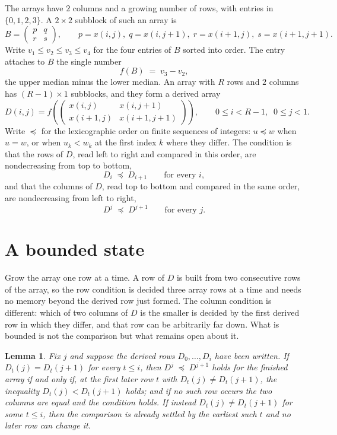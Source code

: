 \documentclass[11pt,a4paper]{article}
\theoremstyle{plain}
\newtheorem{lemma}[theorem]{Lemma}
\theoremstyle{definition}
\begin{document}
The arrays have $2$ columns and a growing number of rows, with entries in $\{0,1,2,3\}$. A
$2\times2$ subblock of such an array is
\[
B=\begin{pmatrix} p & q \\ r & s \end{pmatrix},
\qquad p=x(i,j),\; q=x(i,j+1),\; r=x(i+1,j),\; s=x(i+1,j+1).
\]
Write $v_1\le v_2\le v_3\le v_4$ for the four entries of $B$ sorted into order. The entry attaches to $B$ the single number
\[
f(B)\;=\;v_3-v_2,
\]
the upper median minus the lower median. An array with $R$ rows and $2$ columns has $(R-1)\times1$ subblocks, and they
form a derived array
\[
D(i,j)=f\!\left(\begin{pmatrix} x(i,j) & x(i,j+1) \\ x(i+1,j) & x(i+1,j+1)\end{pmatrix}
\right),\qquad 0\le i<R-1,\;\; 0\le j<1 .
\]
Write $\preceq$ for the lexicographic order on finite sequences of integers: $u\preceq w$ when
$u=w$, or when $u_k<w_k$ at the first index $k$ where they differ. The condition is that the
rows of $D$, read left to right and compared in this order, are nondecreasing from top to bottom,
\[
D_{i}\;\preceq\;D_{i+1}\qquad\text{for every } i,
\]
and that the columns of $D$, read top to bottom and compared in the same order, are nondecreasing
from left to right,
\[
D^{j}\;\preceq\;D^{j+1}\qquad\text{for every } j .
\]

\section{A bounded state}

Grow the array one row at a time. A row of $D$ is built from two consecutive rows of the array,
so the row condition is decided three array rows at a time and needs no memory beyond the
derived row just formed. The column condition is different: which of two columns of $D$ is the
smaller is decided by the first derived row in which they differ, and that row can be
arbitrarily far down. What is bounded is not the comparison but what remains open about it.

\begin{lemma}\label{lem:bits}
Fix $j$ and suppose the derived rows $D_0,\dots,D_i$ have been written. If $D_t(j)=D_t(j+1)$ for
every $t\le i$, then $D^{j}\;\preceq\;D^{j+1}$ holds for the finished array if and only if,
at the first later row $t$ with $D_t(j)\neq D_t(j+1)$, the inequality $D_t(j)<D_t(j+1)$
holds; and if no such row occurs the two columns are equal and the condition holds. If instead
$D_t(j)\neq D_t(j+1)$ for some $t\le i$, then the comparison is already settled by the earliest
such $t$ and no later row can change it.
\end{lemma}
\end{document}
